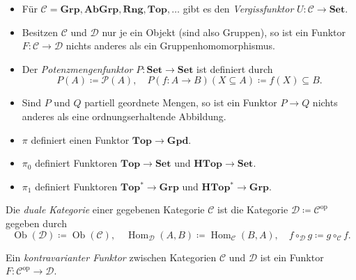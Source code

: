 \documentclass{cheat-sheet}
\DeclareMathOperator{\Ob}{Ob} %
\DeclareMathOperator{\Hom}{Hom} %
\newcommand{\op}{\mathrm{op}} %
\begin{document}
\begin{bspe}
  \begin{itemize}
    \item Für $\mathcal{C} = \mathbf{Grp}, \mathbf{AbGrp}, \mathbf{Rng}, \mathbf{Top}, \ldots$ gibt es den \emph{Vergissfunktor} $U : \mathcal{C} \to \mathbf{Set}$.
    \item Besitzen $\mathcal{C}$ und $\mathcal{D}$ nur je ein Objekt (sind also Gruppen), so ist ein Funktor $F : \mathcal{C} \to \mathcal{D}$ nichts anderes als ein Gruppenhomomorphismus.
    \item Der \emph{Potenzmengenfunktor} $P : \mathbf{Set} \to \mathbf{Set}$ ist definiert durch
    \[ P(A) \coloneqq \mathcal{P}(A), \quad P(f : A \to B)(X \subseteq A) \coloneqq f(X) \subseteq B. \]
    \item Sind $P$ und $Q$ partiell geordnete Mengen, so ist ein Funktor $P \to Q$ nichts anderes als eine ordnungserhaltende Abbildung.
  \end{itemize}
\end{bspe}

\begin{bem}
  \begin{itemize}
    \item $\pi$ definiert einen Funktor $\mathbf{Top} \to \mathbf{Gpd}$.
    \item $\pi_0$ definiert Funktoren $\mathbf{Top} \to \mathbf{Set}$ und $\mathbf{HTop} \to \mathbf{Set}$.
    \item $\pi_1$ definiert Funktoren $\mathbf{Top^*} \to \mathbf{Grp}$ und $\mathbf{HTop^*} \to \mathbf{Grp}$.
  \end{itemize}
\end{bem}

\begin{defn}
  Die \emph{duale Kategorie} einer gegebenen Kategorie $\mathcal{C}$ ist die Kategorie $\mathcal{D} \coloneqq \mathcal{C}^\op$ gegeben durch
  \[
    \Ob(\mathcal{D}) \coloneqq \Ob(\mathcal{C}), \quad
    \Hom_{\mathcal{D}}(A, B) \coloneqq \Hom_{\mathcal{C}}(B, A), \quad
    f \circ_{\mathcal{D}} g \coloneqq g \circ_{\mathcal{C}} f.
  \]
\end{defn}

\begin{defn}
  Ein \emph{kontravarianter Funktor} zwischen Kategorien $\mathcal{C}$ und $\mathcal{D}$ ist ein Funktor $F : \mathcal{C}^\op \to \mathcal{D}$.
\end{defn}
\end{document}
